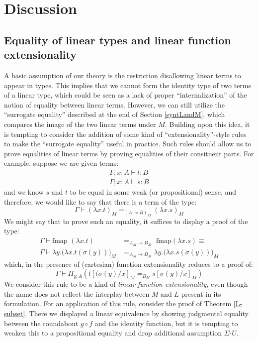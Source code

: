   \section{Discussion}\label{discussion}
  \subsection{Equality of linear types and linear function extensionality}
  A basic assumption of our theory is the restriction disallowing linear terms to appear in types. This implies that we cannot form the identity type of two terms of a linear type, which could be seen as a lack of proper ``internalization'' of the notion of equality between linear terms. However, we can still utilize the ``surrogate equality'' described at the end of Section \ref{syntLandM}, which compares the image of the two linear terms under $M$. Building upon this idea, it is tempting to consider the addition of some kind of ``extensionality''-style rules to make the ``surrogate equality'' useful in practice. Such rules should allow us to prove equalities of linear terms by proving equalities of their consituent parts. For example, suppose we are given terms:
  \[
    \begin{split}
    \Gamma; x : A \vdash t : B\\
    \Gamma; x : A \vdash s : B
    \end{split}
  \]
  and we know $s$ and $t$ to be equal in some weak (or propositional) sense, and therefore, we would like to say that there is a term of the type:
  \[
    \Gamma \vdash (\lambda x. t)_M =_{(A \multimap B)_M} (\lambda x. s)_M
  \]  
  We might say that to prove such an equality, it suffices to display a proof of the type:
  \[
    \begin{split}
      \Gamma \vdash \text{fmap }(\lambda x . t) &=_{A_M \to B_M} \text{ fmap}(\lambda x. s) \equiv \\
      \Gamma \vdash \lambda y. \big (\lambda x. t(\sigma(y)) \big )_M &=_{A_M \to B_M} \lambda y. \big (\lambda x. s(\sigma(y)) \big )_M
    \end{split}
  \]
  which, in the presence of (cartesian) function extensionality reduces to a proof of:
  \[
    \Gamma \vdash \Pi_{y : A} \left ( t[(\sigma(y)/x]_M =_{B_M} s[\sigma(y)/x]_M  \right )
  \]
  We consider this rule to be a kind of \textit{linear function extensionality}, even though the name does not reflect the interplay between $M$ and $L$ present in its formulation. For an application of this rule, consider the proof of Theorem \ref{L-subset}. There we displayed a linear equivalence by showing judgmental equality between the roundabout $g \circ f$ and the identity function, but it is tempting to weaken this to a propositional equality and drop additional assumption $\Sigma$-$U$.


